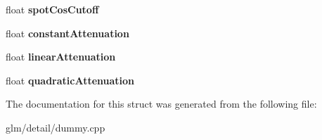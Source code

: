 \begin{DoxyCompactItemize}
\item 
\hypertarget{structlight_a25376f0a1e32235d50ef14edfa18bfb3}{float {\bfseries spot\-Cos\-Cutoff}}\label{structlight_a25376f0a1e32235d50ef14edfa18bfb3}

\item 
\hypertarget{structlight_a788e3a9fbc05cd748dd6a181b6043892}{float {\bfseries constant\-Attenuation}}\label{structlight_a788e3a9fbc05cd748dd6a181b6043892}

\item 
\hypertarget{structlight_aea11b1222a4d5c42f5d69e31751e6fac}{float {\bfseries linear\-Attenuation}}\label{structlight_aea11b1222a4d5c42f5d69e31751e6fac}

\item 
\hypertarget{structlight_afe2993ec0463d57b374b8f5a27f2dfa7}{float {\bfseries quadratic\-Attenuation}}\label{structlight_afe2993ec0463d57b374b8f5a27f2dfa7}

\end{DoxyCompactItemize}


The documentation for this struct was generated from the following file\-:\begin{DoxyCompactItemize}
\item 
glm/detail/dummy.\-cpp\end{DoxyCompactItemize}
